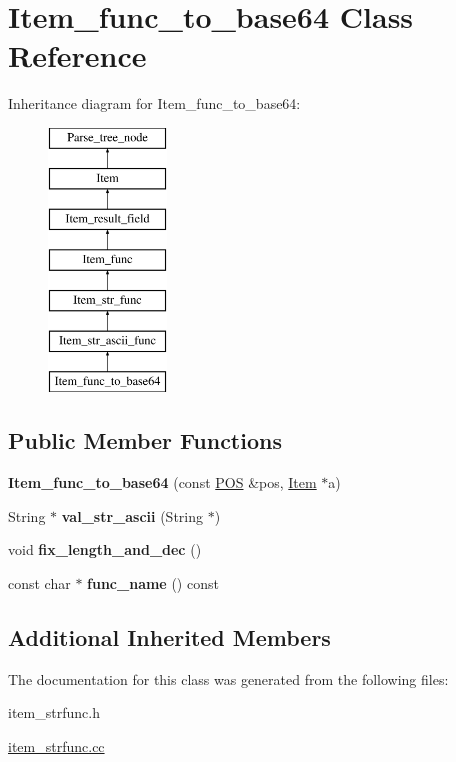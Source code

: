 \hypertarget{classItem__func__to__base64}{}\section{Item\+\_\+func\+\_\+to\+\_\+base64 Class Reference}
\label{classItem__func__to__base64}
Inheritance diagram for Item\+\_\+func\+\_\+to\+\_\+base64\+:\begin{figure}[H]
\begin{center}
\leavevmode
\includegraphics[height=7.000000cm]{classItem__func__to__base64}
\end{center}
\end{figure}
\subsection*{Public Member Functions}
\begin{DoxyCompactItemize}
\item 
\mbox{\label{classItem__func__to__base64_a3eb29110dcd4129133e10cae7dd3abf6}} 
{\bfseries Item\+\_\+func\+\_\+to\+\_\+base64} (const \mbox{\hyperlink{structYYLTYPE}{P\+OS}} \&pos, \mbox{\hyperlink{classItem}{Item}} $\ast$a)
\item 
\mbox{\label{classItem__func__to__base64_a3ea4a4bb412399a68830d4525aeb818f}} 
String $\ast$ {\bfseries val\+\_\+str\+\_\+ascii} (String $\ast$)
\item 
\mbox{\label{classItem__func__to__base64_ab633b52966a976b302a08a949cc9898f}} 
void {\bfseries fix\+\_\+length\+\_\+and\+\_\+dec} ()
\item 
\mbox{\label{classItem__func__to__base64_ae541eb5cb8483549d47ff467ff280313}} 
const char $\ast$ {\bfseries func\+\_\+name} () const
\end{DoxyCompactItemize}
\subsection*{Additional Inherited Members}


The documentation for this class was generated from the following files\+:\begin{DoxyCompactItemize}
\item 
item\+\_\+strfunc.\+h\item 
\mbox{\hyperlink{item__strfunc_8cc}{item\+\_\+strfunc.\+cc}}\end{DoxyCompactItemize}
